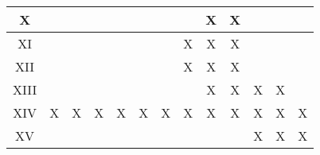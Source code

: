\begin{quadro}[ht]
\begin{tabular}{|ccccccccccccc|}
\hline
\multicolumn{1}{|c|}{X}         & \multicolumn{1}{c|}{}    & \multicolumn{1}{c|}{}    & \multicolumn{1}{c|}{}    & \multicolumn{1}{c|}{}    & \multicolumn{1}{c|}{}    & \multicolumn{1}{c|}{}    & \multicolumn{1}{c|}{}    & \multicolumn{1}{c|}{X}    & \multicolumn{1}{c|}{X}    & \multicolumn{1}{c|}{}    & \multicolumn{1}{c|}{}    &   \multicolumn{1}{c|}{}  \\ 
\hline
\multicolumn{1}{|c|}{XI}        & \multicolumn{1}{c|}{}    & \multicolumn{1}{c|}{}    & \multicolumn{1}{c|}{}    & \multicolumn{1}{c|}{}    & \multicolumn{1}{c|}{}    & \multicolumn{1}{c|}{}    & \multicolumn{1}{c|}{X}    & \multicolumn{1}{c|}{X}    & \multicolumn{1}{c|}{X}    & \multicolumn{1}{c|}{}    & \multicolumn{1}{c|}{}    &   \multicolumn{1}{c|}{}  \\ 
\hline
\multicolumn{1}{|c|}{XII}       & \multicolumn{1}{c|}{}    & \multicolumn{1}{c|}{}    & \multicolumn{1}{c|}{}    & \multicolumn{1}{c|}{}    & \multicolumn{1}{c|}{}    & \multicolumn{1}{c|}{}    & \multicolumn{1}{c|}{X}    & \multicolumn{1}{c|}{X}    & \multicolumn{1}{c|}{X}    & \multicolumn{1}{c|}{}    & \multicolumn{1}{c|}{}    &  \multicolumn{1}{c|}{}   \\ 
\hline
\multicolumn{1}{|c|}{XIII}      & \multicolumn{1}{c|}{}    & \multicolumn{1}{c|}{}    & \multicolumn{1}{c|}{}    & \multicolumn{1}{c|}{}    & \multicolumn{1}{c|}{}    & \multicolumn{1}{c|}{}    & \multicolumn{1}{c|}{}    & \multicolumn{1}{c|}{X}    & \multicolumn{1}{c|}{X}    & \multicolumn{1}{c|}{X}    & \multicolumn{1}{c|}{X}    &  \multicolumn{1}{c|}{}   \\ 
\hline
\multicolumn{1}{|c|}{XIV}        & \multicolumn{1}{c|}{X}    & \multicolumn{1}{c|}{X}    & \multicolumn{1}{c|}{X}    & \multicolumn{1}{c|}{X}    & \multicolumn{1}{c|}{X}    & \multicolumn{1}{c|}{X}    & \multicolumn{1}{c|}{X}    & \multicolumn{1}{c|}{X}    & \multicolumn{1}{c|}{X}    & \multicolumn{1}{c|}{X}    & \multicolumn{1}{c|}{X}    &   \multicolumn{1}{c|}{X}  \\ 
\hline
\multicolumn{1}{|c|}{XV}         & \multicolumn{1}{c|}{}    & \multicolumn{1}{c|}{}    & \multicolumn{1}{c|}{}    & \multicolumn{1}{c|}{}    & \multicolumn{1}{c|}{}    & \multicolumn{1}{c|}{}    & \multicolumn{1}{c|}{}    & \multicolumn{1}{c|}{}    & \multicolumn{1}{c|}{}    & \multicolumn{1}{c|}{X}    & \multicolumn{1}{c|}{X}    &   \multicolumn{1}{c|}{X}  \\ 
\hline
\end{tabular}
\end{quadro}
